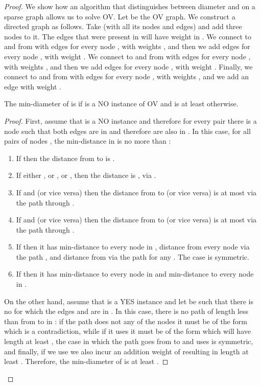 \begin{proof}

We show how an algorithm that distinguishes between diameter  and  on a sparse graph allows us to solve OV.
Let  be the OV graph. We construct a directed graph  as follows.
Take  (with all its nodes and edges) and add three nodes  to it.
The edges that were present in  will have weight  in .
We connect  to and from  with edges  for every node , with weights , and then we add edges  for every node , with weight .
We connect  to and from  with edges  for every node , with weights ,  and then we add edges  for every node , with weight .
Finally, we connect  to and from  with edges  for every node , with weights , and we add an edge  with weight .

\begin{claim}
The min-diameter of  is  if  is a NO instance of OV and is at least  otherwise.
\end{claim}

\begin{proof}
First, assume that  is a NO instance and therefore for every pair  there is a node  such that both edges  are in  and therefore are also in .
In this case, for all pairs of nodes , the min-distance in  is no more than :
\begin{enumerate} 
\item If  then the distance from  to  is .
\item If either , or , or , then the distance is , via .
\item If  and  (or vice versa) then the distance from  to  (or vice versa) is at most  via the path through .
\item If  and  (or vice versa) then the distance from  to  (or vice versa) is at most  via the path through .
\item If  then it has min-distance  to every node in , distance  from every node  via the path , and distance  from  via the path  for any . The  case is symmetric.
\item If  then it has min-distance  to every node in  and min-distance  to every node in .
\end{enumerate}
On the other hand, assume that  is a YES instance and let  be such that there is no  for which the edges  and  are in . 
In this case, there is no path of length less than  from  to  in : if the path does not any of the nodes  it must be of the form  which is a contradiction, while if it uses  it must be of the form  which will have length at least , the case in which the path goes from  to  and uses  is symmetric, and finally, if we use  we also incur an addition weight of  resulting in length at least .
Therefore, the min-diameter of  is at least .
\end{proof}

\end{proof}

